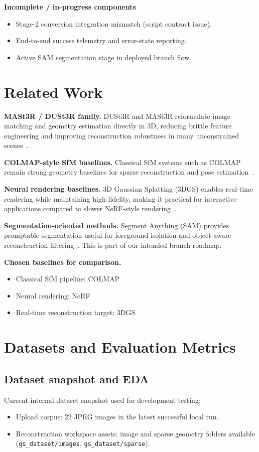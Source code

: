 \documentclass[10pt,twocolumn,letterpaper]{article}
\begin{document}
\textbf{Incomplete / in-progress components}
\begin{itemize}[leftmargin=*]
    \item Stage-2 conversion integration mismatch (script contract issue).
    \item End-to-end success telemetry and error-state reporting.
    \item Active SAM segmentation stage in deployed branch flow.
\end{itemize}

\section{Related Work}
\textbf{MASt3R / DUSt3R family.} DUSt3R and MASt3R reformulate image matching and geometry estimation directly in 3D, reducing brittle feature engineering and improving reconstruction robustness in many unconstrained scenes~\cite{dust3r,mast3r}.

\textbf{COLMAP-style SfM baselines.} Classical SfM systems such as COLMAP remain strong geometry baselines for sparse reconstruction and pose estimation~\cite{colmap}.

\textbf{Neural rendering baselines.} 3D Gaussian Splatting (3DGS) enables real-time rendering while maintaining high fidelity, making it practical for interactive applications compared to slower NeRF-style rendering~\cite{3dgs,nerf}.

\textbf{Segmentation-oriented methods.} Segment Anything (SAM) provides promptable segmentation useful for foreground isolation and object-aware reconstruction filtering~\cite{sam}. This is part of our intended branch roadmap.

\textbf{Chosen baselines for comparison.}
\begin{itemize}[leftmargin=*]
    \item Classical SfM pipeline: COLMAP~\cite{colmap}
    \item Neural rendering: NeRF~\cite{nerf}
    \item Real-time reconstruction target: 3DGS~\cite{3dgs}
\end{itemize}

\section{Datasets and Evaluation Metrics}
\subsection{Dataset snapshot and EDA}
Current internal dataset snapshot used for development testing:
\begin{itemize}[leftmargin=*]
    \item Upload corpus: 22 JPEG images in the latest successful local run.
    \item Reconstruction workspace assets: image and sparse geometry folders available (\texttt{gs\_dataset/images}, \texttt{gs\_dataset/sparse}).
\end{itemize}
\end{document}
